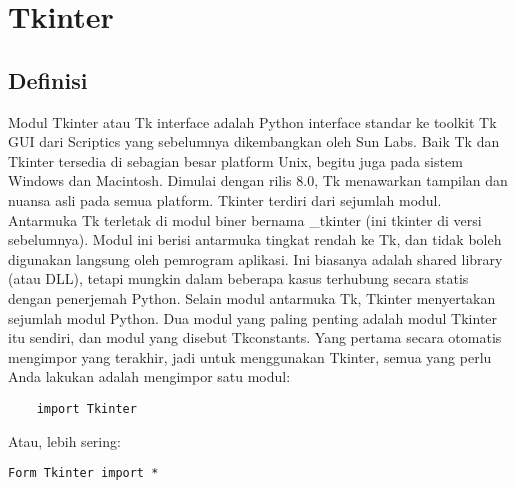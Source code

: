 \section {Tkinter}

\subsection{Definisi}
Modul Tkinter atau Tk interface adalah Python interface standar ke toolkit Tk GUI dari Scriptics yang sebelumnya dikembangkan oleh Sun Labs. Baik Tk dan Tkinter tersedia di sebagian besar platform Unix, begitu juga pada sistem Windows dan Macintosh. Dimulai dengan rilis 8.0, Tk menawarkan tampilan dan nuansa asli pada semua platform. Tkinter terdiri dari sejumlah modul. Antarmuka Tk terletak di modul biner bernama _tkinter (ini tkinter di versi sebelumnya). Modul ini berisi antarmuka tingkat rendah ke Tk, dan tidak boleh digunakan langsung oleh pemrogram aplikasi. Ini biasanya adalah shared library (atau DLL), tetapi mungkin dalam beberapa kasus terhubung secara statis dengan penerjemah Python. Selain modul antarmuka Tk, Tkinter menyertakan sejumlah modul Python. Dua modul yang paling penting adalah modul Tkinter itu sendiri, dan modul yang disebut Tkconstants. Yang pertama secara otomatis mengimpor yang terakhir, jadi untuk menggunakan Tkinter, semua yang perlu Anda lakukan adalah mengimpor satu modul: 

\begin {verbatim}
	import Tkinter
\end {verbatim}
	
Atau, lebih sering:

\begin {verbatim} 
Form Tkinter import *
\end {verbatim}